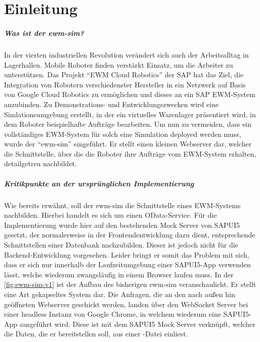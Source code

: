 \chapter{Einleitung}

\paragraph{Was ist der \ac{ewm-sim}?}
In der vierten industriellen Revolution verändert sich auch der Arbeitsalltag in Lagerhallen.
Mobile Roboter finden verstärkt Einsatz, um die Arbeiter zu unterstützen.
Das Projekt \enquote{\ac{EWM} Cloud Robotics} der SAP hat das Ziel, die Integration von Robotern verschiedenster Hersteller in ein Netzwerk auf Basis von Google Cloud Robotics zu ermöglichen und dieses an ein SAP \ac{EWM}-System anzubinden.
Zu Demonstrations- und Entwicklungszwecken wird eine Simlationsumgebung erstellt, in der ein virtuelles Warenlager präsentiert wird, in dem Roboter beispielhafte Aufträge bearbeiten.
Um nun zu vermeiden, dass ein vollständiges \ac{EWM}-System für solch eine Simulation deployed werden muss, wurde der \enquote{\ac{ewm-sim}} eingeführt.
Er stellt einen kleinen Webserver dar, welcher die Schnittstelle, über die die Roboter ihre Aufträge vom \ac{EWM}-System erhalten, detailgetreu nachbildet.

\paragraph{Kritikpunkte an der ursprünglichen Implementierung}
Wie bereits erwähnt, soll der \ac{ewm-sim} die Schnittstelle eines \ac{EWM}-Systems nachbilden. Hierbei handelt es sich um einen \ac{OData}-Service.
Für die Implementierung wurde hier auf den bestehenden Mock Server von SAPUI5 gesetzt, der normalerweise in der Frontendentwicklung dazu dient, entsprechende Schnittstellen einer Datenbank nachzubilden.
Dieser ist jedoch nicht für die Backend-Entwicklung vorgesehen.
Leider bringt er somit das Problem mit sich, dass er sich nur innerhalb der Laufzeitumgebung einer SAPUI5-App verwenden lässt, welche wiederum zwangsläufig in einem Browser laufen muss.
In der \autoref{fig:ewm-sim-v1} ist der Aufbau des bisherigen \ac{ewm-sim} veranschaulicht.
Er stellt eine Art gekapseltes System dar.
Die Anfragen, die an den nach außen hin geöffneten Webserver geschickt werden, landen über den WebSocket Server bei einer headless Instanz von Google Chrome, in welchem wiederum eine SAPUI5-App ausgeführt wird.
Diese ist mit dem SAPUI5 Mock Server verknüpft, welcher die Daten, die er bereitstellen soll, aus einer -Datei einliest.

